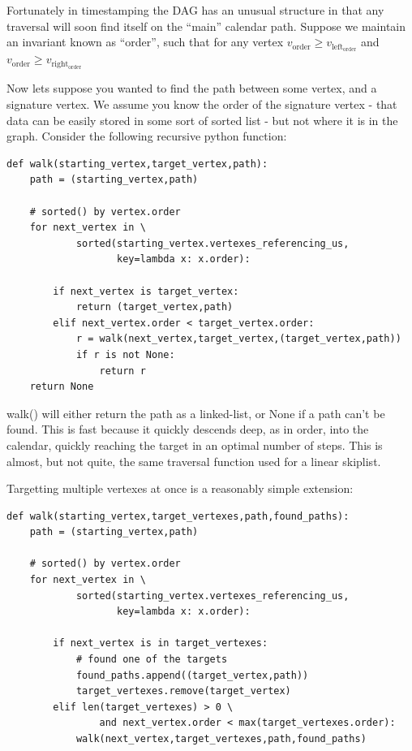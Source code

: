 \documentclass{article}
\begin{document}
Fortunately in timestamping the DAG has an unusual structure in that any
traversal will soon find itself on the ``main'' calendar path. Suppose we
maintain an invariant known as ``order'', such that for any vertex
$v_\mathrm{order} \ge v_{\mathrm{left}_\mathrm{order}}$ and $v_\mathrm{order}
\ge v_{\mathrm{right}_\mathrm{order}}$

Now lets suppose you wanted to find the path between some vertex, and a
signature vertex. We assume you know the order of the signature vertex - that
data can be easily stored in some sort of sorted list - but not where it is in
the graph. Consider the following recursive python function:

\begin{verbatim}
def walk(starting_vertex,target_vertex,path):
    path = (starting_vertex,path)

    # sorted() by vertex.order
    for next_vertex in \
            sorted(starting_vertex.vertexes_referencing_us,
                   key=lambda x: x.order):

        if next_vertex is target_vertex:
            return (target_vertex,path)
        elif next_vertex.order < target_vertex.order:
            r = walk(next_vertex,target_vertex,(target_vertex,path))
            if r is not None:
                return r
    return None
\end{verbatim}

walk() will either return the path as a linked-list, or None if a path can't be
found. This is fast because it quickly descends deep, as in order, into the
calendar, quickly reaching the target in an optimal number of steps. This is
almost, but not quite, the same traversal function used for a linear skiplist. 

Targetting multiple vertexes at once is a reasonably simple extension:

\begin{verbatim}
def walk(starting_vertex,target_vertexes,path,found_paths):
    path = (starting_vertex,path)

    # sorted() by vertex.order
    for next_vertex in \ 
            sorted(starting_vertex.vertexes_referencing_us,
                   key=lambda x: x.order):

        if next_vertex is in target_vertexes:
            # found one of the targets
            found_paths.append((target_vertex,path))
            target_vertexes.remove(target_vertex)
        elif len(target_vertexes) > 0 \
                and next_vertex.order < max(target_vertexes.order):
            walk(next_vertex,target_vertexes,path,found_paths)
\end{verbatim}
\end{document}
